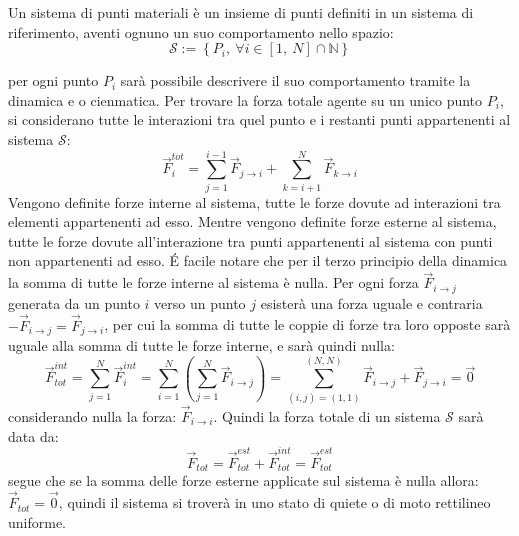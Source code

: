 \documentclass{article}
\numberwithin{equation}{subsection}
\begin{document}
Un sistema di punti materiali è un insieme di punti definiti 
in un sistema di riferimento, aventi ognuno un suo 
comportamento nello spazio:
\begin{equation}
    \mathscr{S}:=\left\{P_i,\:\forall i\in[1,\:N]\cap\mathbb{N}\right\}
\end{equation}

\begin{center}\end{center}

per ogni punto $P_i$ sarà possibile descrivere il suo 
comportamento tramite la dinamica e o cienmatica. 
Per trovare la forza totale agente su un unico punto $P_i$, si 
considerano tutte le interazioni tra quel punto e i restanti punti 
appartenenti al sistema $\mathscr{S}$:
\begin{equation}
    \vec{F}^{tot}_i=\displaystyle\sum_{j=1}^{i-1}\vec{F}_{j\to i}+\sum_{k=i+1}^{N}\vec{F}_{k\to i}
\end{equation}
Vengono definite forze interne al sistema, tutte le forze 
dovute ad interazioni tra elementi appartenenti ad esso.
Mentre vengono definite forze esterne al sistema, tutte le forze 
dovute all'interazione tra punti appartenenti al sistema con 
punti non appartenenti ad esso. 
\'{E} facile notare che per il terzo principio della dinamica 
la somma di tutte le forze interne al sistema è nulla. Per ogni 
forza $\vec{F}_{i\to j}$ generata da un punto $i$ verso un punto $j$ 
esisterà una forza uguale e contraria $-\vec{F}_{i\to j}=\vec{F}_{j\to i}$, 
per cui la somma di tutte le coppie di forze tra loro opposte 
sarà uguale alla somma di tutte le forze interne, e sarà quindi nulla:
\begin{equation}
    \vec{F}_{tot}^{int}=\displaystyle\sum_{j=1}^{N}\vec{F}_i^{int}=\sum_{i=1}^{N}\left(\sum_{j=1}^{N}\vec{F}_{i\to j}\right)=\sum_{(i,j)=(1,1)}^{(N,N)}\vec{F}_{i\to j}+\vec{F}_{j\to i}=\vec{0}
\end{equation}
considerando nulla la forza: $\vec{F}_{i\to i}$.
Quindi la forza totale di un sistema $\mathscr{S}$ sarà data da:
\begin{equation}
    \vec{F}_{tot}=\vec{F}^{est}_{tot}+\vec{F}^{int}_{tot}=\vec{F}^{est}_{tot}
\end{equation}
segue che se la somma delle forze esterne applicate sul sistema 
è nulla allora: $\vec{F}_{tot}=\vec{0}$, quindi il sistema 
si troverà in uno stato di quiete o di moto rettilineo uniforme. 
\end{document}
